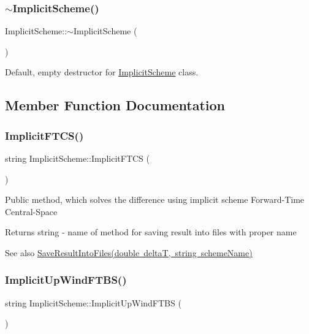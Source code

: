 \subsubsection{\texorpdfstring{$\sim$\+Implicit\+Scheme()}{~ImplicitScheme()}}
{\footnotesize\ttfamily Implicit\+Scheme\+::$\sim$\+Implicit\+Scheme (\begin{DoxyParamCaption}{ }\end{DoxyParamCaption})}

Default, empty destructor for \mbox{\hyperlink{class_implicit_scheme}{Implicit\+Scheme}} class. 

\subsection{Member Function Documentation}
\mbox{\label{class_implicit_scheme_afd2b8e73e914a04c326b8cba0d5810ce}} 
\subsubsection{\texorpdfstring{Implicit\+F\+T\+C\+S()}{ImplicitFTCS()}}
{\footnotesize\ttfamily string Implicit\+Scheme\+::\+Implicit\+F\+T\+CS (\begin{DoxyParamCaption}{ }\end{DoxyParamCaption})}

Public method, which solves the difference using implicit scheme Forward-\/\+Time Central-\/\+Space \begin{DoxyReturn}{Returns}
string -\/ name of method for saving result into files with proper name 
\end{DoxyReturn}
\begin{DoxySeeAlso}{See also}
\mbox{\hyperlink{class_scheme_ae4512b4c8ead4d8ced95174f0b241f8a}{Save\+Result\+Into\+Files(double delta\+T, string scheme\+Name)}} 
\end{DoxySeeAlso}
\mbox{\label{class_implicit_scheme_ab8311a005d69690622e0ddaa0dcff94d}} 
\subsubsection{\texorpdfstring{Implicit\+Up\+Wind\+F\+T\+B\+S()}{ImplicitUpWindFTBS()}}
{\footnotesize\ttfamily string Implicit\+Scheme\+::\+Implicit\+Up\+Wind\+F\+T\+BS (\begin{DoxyParamCaption}{ }\end{DoxyParamCaption})}


